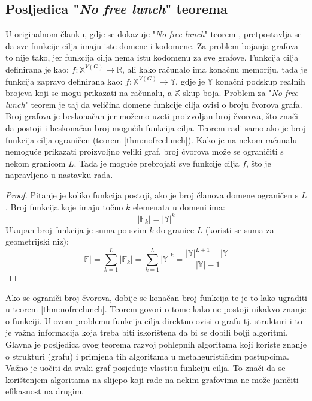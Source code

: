 \documentclass[times, utf8, diplomski, numeric]{fer}
\begin{document}
\subsection{Posljedica "\emph{No free lunch}" teorema}

U originalnom članku, gdje se dokazuje "\emph{No free lunch}" teorem \cite{lit15}, pretpostavlja se da sve funkcije cilja imaju iste domene i kodomene. Za problem bojanja grafova to nije tako, jer funkcija cilja nema istu kodomenu za sve grafove. Funkcija cilja definirana je kao: $f:\mathbb{X}^{V(G)} \rightarrow \mathbb{R}$, ali kako računalo ima konačnu memoriju, tada je funkcija zapravo definirana kao: $f:\mathbb{X}^{V(G)} \rightarrow \mathbb{Y}$, gdje je $\mathbb{Y}$ konačni podskup realnih brojeva koji se mogu prikazati na računalu, a $\mathbb{X}$ skup boja. Problem za "\emph{No free lunch}" teorem je taj da veličina domene funkcije cilja ovisi o broju čvorova grafa. Broj grafova je beskonačan jer možemo uzeti proizvoljan broj čvorova, što znači da postoji i beskonačan broj mogućih funkcija cilja. Teorem radi samo ako je broj funkcija cilja ograničen (teorem \ref{thm:nofreelunch}). Kako je na nekom računalu nemoguće prikazati proizvoljno veliki graf, broj čvorova može se ograničiti s nekom granicom $L$. Tada je moguće prebrojati sve funkcije cilja $f$, što je napravljeno u nastavku rada.

\begin{proof}
Pitanje je koliko funkcija postoji, ako je broj članova domene ograničen s $L$.
Broj funkcija koje imaju točno $k$ elemenata u domeni ima:
	\begin{equation}
		|\mathbb{F}_k| = |\mathbb{Y}|^k
	\end{equation}
Ukupan broj funkcija je suma po svim $k$ do granice $L$ (koristi se suma za geometrijski niz):
	\begin{equation}
		|\mathbb{F}| = \sum_{k=1}^{L}|\mathbb{F}_k| = \sum_{k=1}^{L} |\mathbb{Y}|^k = \frac{|\mathbb{Y}|^{L+1}-|\mathbb{Y}|}{|\mathbb{Y}|-1}
	\end{equation}
\end{proof} 

Ako se ograniči broj čvorova, dobije se konačan broj funkcija te je to lako ugraditi u teorem \ref{thm:nofreelunch}. Teorem govori o tome kako ne postoji nikakvo znanje o funkciji. U ovom problemu funkcija cilja direktno ovisi o grafu tj. strukturi i to je važna informacija koja treba biti iskorištena da bi se dobili bolji algoritmi. Glavna je posljedica ovog teorema razvoj pohlepnih algoritama koji koriste znanje o strukturi (grafu) i primjena tih algoritama u metaheurističkim postupcima. 
Važno je uočiti da svaki graf posjeduje vlastitu funkciju cilja. To znači da se korištenjem algoritama na slijepo koji rade na nekim grafovima ne može jamčiti efikasnost na drugim.
\end{document}
